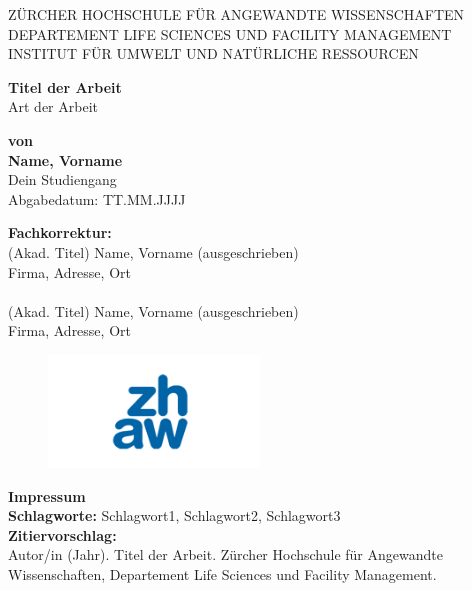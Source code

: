 \documentclass[a4paper,12pt,twoside]{article}
\begin{document}
	
	\begin{titlepage}
		\centering
		{\large \MakeUppercase{Zürcher Hochschule für Angewandte Wissenschaften}\\
			\MakeUppercase{Departement Life Sciences und Facility Management}\\
			\MakeUppercase{Institut für Umwelt und natürliche Ressourcen}\\[1.5cm]}
		
		{\Large \textbf{Titel der Arbeit}\\[1cm]}
		{\large{Art der Arbeit}\\[2cm]}
		
		\begin{center}
			\textbf{von}\\
			\textbf{Name, Vorname}\\
			Dein Studiengang\\
			Abgabedatum: TT.MM.JJJJ
		\end{center}
		
		\vspace{1cm}
		\begin{tabbing}
			\textbf{Fachkorrektur:} \\
			(Akad. Titel) Name, Vorname (ausgeschrieben)\\
			Firma, Adresse, Ort\\
			\\%
			(Akad. Titel) Name, Vorname (ausgeschrieben)\\
			Firma, Adresse, Ort\\
		\end{tabbing}
			
		\vfill
		\begin{figure}[t]
			\raggedleft
			\includegraphics[width=0.5\textwidth]{zhawGR_logo.png} %
		\end{figure}
	\end{titlepage}
	
	
	\newpage
	\thispagestyle{empty}
	\vspace*{18cm}
	\noindent
	\textbf{Impressum}\\[1cm]
	\textbf{Schlagworte:} Schlagwort1, Schlagwort2, Schlagwort3\\[0.5cm]
	\textbf{Zitiervorschlag:}\\
	Autor/in (Jahr). Titel der Arbeit. Zürcher Hochschule für Angewandte Wissenschaften, Departement Life Sciences und Facility Management.
	
\end{document}
